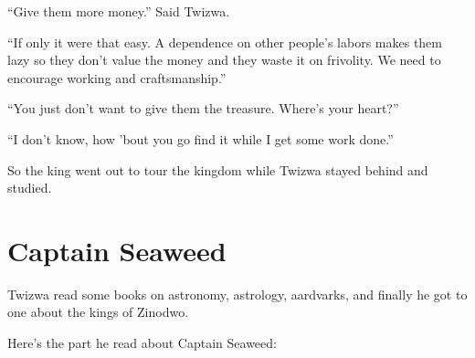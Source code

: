 ``Give them more money.'' Said Twi\-zwa.

``If only it were that easy. A dependence on other people's labors makes them lazy so they don't value the money and they waste it on frivolity. We need to encourage working and craftsmanship.''

``You just don't want to give them the treasure. Where's your heart?''

``I don't know, how 'bout you go find it while I get some work done.''

So the king went out to tour the kingdom while Twi\-zwa stayed behind and studied.

\section{Captain Seaweed}

Twi\-zwa read some books on astronomy, astrology, aardvarks, and finally he got to one about the kings of Zi\-no\-dwo.

Here's the part he read about Captain Seaweed:

